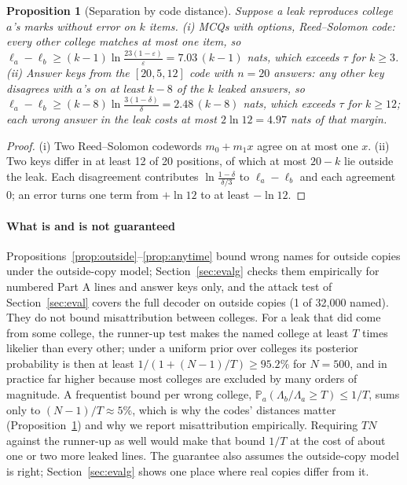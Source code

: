 \documentclass[10pt,a4paper]{article}
\newtheorem{proposition}{Proposition}
\theoremstyle{remark}
\newcommand{\pr}{\mathbb{P}}
\begin{document}
\begin{proposition}[Separation by code distance]\label{prop:distance}
Suppose a leak reproduces college $a$'s marks without error on $k$ items. (i) MCQs with options, Reed--Solomon code: every other college matches at most one item, so $\ell_a-\ell_b\ge(k-1)\ln\frac{23(1-\varepsilon)}{\varepsilon}=7.03\,(k-1)$ nats, which exceeds $\tau$ for $k\ge3$. (ii) Answer keys from the $[20,5,12]$ code with $n=20$ answers: any other key disagrees with $a$'s on at least $k-8$ of the $k$ leaked answers, so $\ell_a-\ell_b\ge(k-8)\ln\frac{3(1-\delta)}{\delta}=2.48\,(k-8)$ nats, which exceeds $\tau$ for $k\ge12$; each wrong answer in the leak costs at most $2\ln12=4.97$ nats of that margin.
\end{proposition}
\begin{proof}
(i) Two Reed--Solomon codewords $m_0+m_1x$ agree on at most one $x$. (ii) Two keys differ in at least 12 of 20 positions, of which at most $20-k$ lie outside the leak. Each disagreement contributes $\ln\frac{1-\delta}{\delta/3}$ to $\ell_a-\ell_b$ and each agreement 0; an error turns one term from $+\ln12$ to at least $-\ln12$.
\end{proof}

\paragraph{What is and is not guaranteed} Propositions~\ref{prop:outside}--\ref{prop:anytime} bound wrong names for outside copies under the outside-copy model; Section~\ref{sec:evalg} checks them empirically for numbered Part A lines and answer keys only, and the attack test of Section~\ref{sec:eval} covers the full decoder on outside copies (1 of 32{,}000 named). They do not bound misattribution between colleges. For a leak that did come from some college, the runner-up test makes the named college at least $T$ times likelier than every other; under a uniform prior over colleges its posterior probability is then at least $1/(1+(N-1)/T)\ge95.2\%$ for $N=500$, and in practice far higher because most colleges are excluded by many orders of magnitude. A frequentist bound per wrong college, $\pr_a(\Lambda_b/\Lambda_a\ge T)\le 1/T$, sums only to $(N-1)/T\approx5\%$, which is why the codes' distances matter (Proposition~\ref{prop:distance}) and why we report misattribution empirically. Requiring $TN$ against the runner-up as well would make that bound $1/T$ at the cost of about one or two more leaked lines. The guarantee also assumes the outside-copy model is right; Section~\ref{sec:evalg} shows one place where real copies differ from it.
\end{document}
